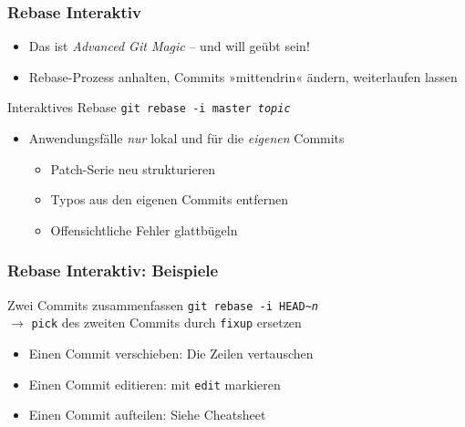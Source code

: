 \documentclass{beamer}
\begin{document}
\begin{frame}
 \frametitle{Rebase Interaktiv}
  


\begin{itemize}
  \item Das ist \emph{Advanced Git Magic} -- und will geübt sein!
  \item Rebase-Prozess anhalten, Commits »mittendrin« ändern, weiterlaufen lassen
\end{itemize}

\begin{block}{Interaktives Rebase}
\texttt{git rebase -i master \emph{topic}}
\end{block}

\begin{itemize}
  \item Anwendungsfälle \emph{nur} lokal und für die \emph{eigenen} Commits
\begin{itemize}
  \item Patch-Serie neu strukturieren
  \item Typos aus den eigenen Commits entfernen
  \item Offensichtliche Fehler glattbügeln
\end{itemize}
\end{itemize}

  
 \end{frame}
\begin{frame}
 \frametitle{Rebase Interaktiv: Beispiele}
  


\begin{block}{Zwei Commits zusammenfassen}
\texttt{git rebase -i HEAD\textasciitilde{}\emph{n}}\\
$\rightarrow$ \texttt{pick} des zweiten Commits durch \texttt{fixup} ersetzen
\end{block}

\begin{itemize}
  \item Einen Commit verschieben: Die Zeilen vertauschen
  \item Einen Commit editieren: mit \texttt{edit} markieren
  \item Einen Commit aufteilen: Siehe Cheatsheet
\end{itemize}

  
 \end{frame}
\end{document}
